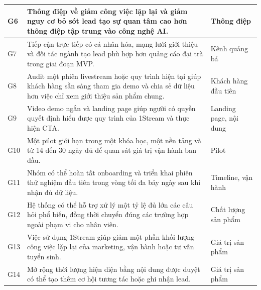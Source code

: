 \begin{longtable}{
    p{}
    p{}
    p{}
}
    \hline

    G6
    &
    Thông điệp về giảm công việc lặp lại và giảm nguy cơ bỏ sót lead tạo sự quan tâm cao hơn thông điệp tập trung vào công nghệ AI.
    &
    Thông điệp \\

    \hline

    G7
    &
    Tiếp cận trực tiếp có cá nhân hóa, mạng lưới giới thiệu và đối tác ngành tạo lead phù hợp hơn quảng cáo đại trà trong giai đoạn MVP.
    &
    Kênh quảng bá \\

    \hline

    G8
    &
    Audit một phiên livestream hoặc quy trình hiện tại giúp khách hàng sẵn sàng tham gia demo và chia sẻ dữ liệu hơn việc chỉ xem giới thiệu sản phẩm chung.
    &
    Khách hàng đầu tiên \\

    \hline

    G9
    &
    Video demo ngắn và landing page giúp người có quyền quyết định hiểu được quy trình của 1Stream và thực hiện CTA.
    &
    Landing page, nội dung \\

    \hline

    G10
    &
    Một pilot giới hạn trong một khóa học, một nền tảng và từ 14 đến 30 ngày đủ để quan sát giá trị vận hành ban đầu.
    &
    Pilot \\

    \hline

    G11
    &
    Nhóm có thể hoàn tất onboarding và triển khai phiên thử nghiệm đầu tiên trong vòng tối đa bảy ngày sau khi nhận đủ dữ liệu.
    &
    Timeline, vận hành \\

    \hline

    G12
    &
    Hệ thống có thể hỗ trợ xử lý một tỷ lệ đủ lớn các câu hỏi phổ biến, đồng thời chuyển đúng các trường hợp ngoài phạm vi cho nhân viên.
    &
    Chất lượng sản phẩm \\

    \hline

    G13
    &
    Việc sử dụng 1Stream giúp giảm một phần khối lượng công việc lặp lại của marketing, vận hành hoặc tư vấn tuyển sinh.
    &
    Giá trị sản phẩm \\

    \hline

    G14
    &
    Mở rộng thời lượng hiện diện bằng nội dung được duyệt có thể tạo thêm cơ hội tương tác hoặc ghi nhận lead.
    &
    Giá trị sản phẩm \\


\end{longtable}
